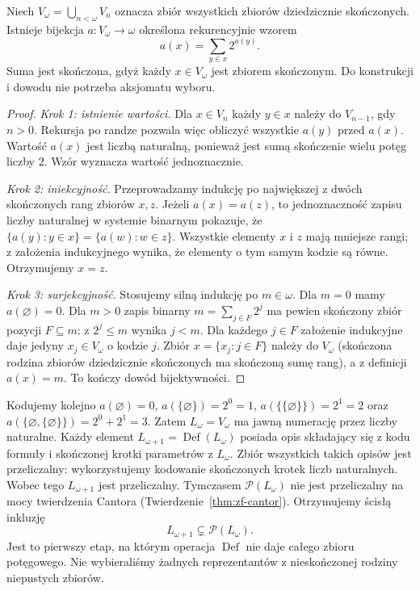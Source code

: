 \begin{lemat}
\label{lem:lvi-ackermann-code}
Niech $V_\omega=\bigcup_{n<\omega}V_n$ oznacza zbiór
wszystkich zbiorów dziedzicznie skończonych. Istnieje
bijekcja $a\colon V_\omega\to\omega$ określona
rekurencyjnie wzorem
\[
 a(x)=\sum_{y\in x}2^{a(y)}.
\]
Suma jest skończona, gdyż każdy $x\in V_\omega$
jest zbiorem skończonym. Do konstrukcji i dowodu nie
potrzeba aksjomatu wyboru.
\end{lemat}
\begin{proof}
\emph{Krok 1: istnienie wartości.}
Dla $x\in V_n$ każdy $y\in x$ należy do $V_{n-1}$,
gdy $n>0$. Rekursja po randze pozwala więc obliczyć
wszystkie $a(y)$ przed $a(x)$. Wartość $a(x)$ jest
liczbą naturalną, ponieważ jest sumą skończenie
wielu potęg liczby $2$. Wzór wyznacza wartość jednoznacznie.

\emph{Krok 2: iniekcyjność.}
Przeprowadzamy indukcję po największej z dwóch
skończonych rang zbiorów $x,z$. Jeżeli $a(x)=a(z)$,
to jednoznaczność zapisu liczby naturalnej w systemie
binarnym pokazuje, że
$\{a(y):y\in x\}=\{a(w):w\in z\}$.
Wszystkie elementy $x$ i $z$ mają mniejsze rangi;
z założenia indukcyjnego wynika, że elementy o tym
samym kodzie są równe. Otrzymujemy $x=z$.

\emph{Krok 3: surjekcyjność.}
Stosujemy silną indukcję po $m\in\omega$. Dla $m=0$
mamy $a(\varnothing)=0$. Dla $m>0$ zapis binarny
$m=\sum_{j\in F}2^j$ ma pewien skończony zbiór
pozycji $F\subseteq m$: z $2^j\le m$ wynika $j<m$.
Dla każdego $j\in F$ założenie indukcyjne daje
jedyny $x_j\in V_\omega$ o kodzie $j$.
Zbiór $x=\{x_j:j\in F\}$ należy do $V_\omega$
(skończona rodzina zbiorów dziedzicznie skończonych
ma skończoną sumę rang), a z definicji $a(x)=m$.
To kończy dowód bijektywności.
\end{proof}
\begin{przyklad}
\label{ex:lvi-first-infinite-level}
Kodujemy kolejno
$a(\varnothing)=0$, $a(\{\varnothing\})=2^0=1$,
$a(\{\{\varnothing\}\})=2^1=2$ oraz
$a(\{\varnothing,\{\varnothing\}\})=2^0+2^1=3$.
Zatem $L_\omega=V_\omega$ ma jawną numerację
przez liczby naturalne. Każdy element
$L_{\omega+1}=\operatorname{Def}(L_\omega)$
posiada opis składający się z kodu formuły i
skończonej krotki parametrów z $L_\omega$.
Zbiór wszystkich takich opisów jest przeliczalny:
wykorzystujemy kodowanie skończonych krotek
liczb naturalnych. Wobec tego $L_{\omega+1}$
jest przeliczalny. Tymczasem
$\mathcal P(L_\omega)$ nie jest przeliczalny
na mocy twierdzenia Cantora
(Twierdzenie~\ref{thm:zf-cantor}). Otrzymujemy ścisłą
inkluzję
\[
 L_{\omega+1}\subsetneq\mathcal P(L_\omega).
\]
Jest to pierwszy etap, na którym operacja
$\operatorname{Def}$ nie daje całego zbioru
potęgowego. Nie wybieraliśmy żadnych reprezentantów
z nieskończonej rodziny niepustych zbiorów.
\end{przyklad}

